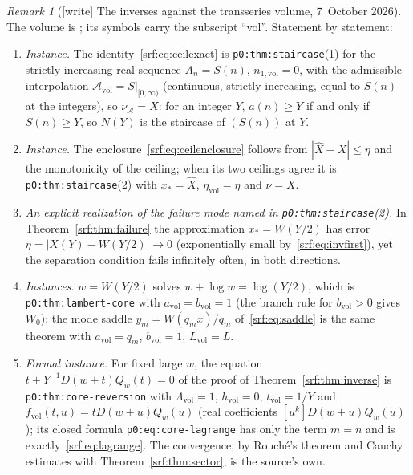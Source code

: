 \documentclass[11pt]{article}
\theoremstyle{remark}\newtheorem{remark}[theorem]{Remark}
\newcommand{\file}[1]{\nolinkurl{#1}}
\begin{document}
\begin{remark}[{[write]} The inverses against the transseries volume, 7~October 2026]\label{srf:rem:transseries}
The volume is
;
its symbols carry the subscript ``vol''. Statement by statement:
\begin{enumerate}[label=(\alph*)]
\item \emph{Instance.} The identity~\eqref{srf:eq:ceilexact} is
 \file{p0:thm:staircase}(1) for the strictly increasing real sequence
 $A_n=S(n)$, $n_{1,\mathrm{vol}}=0$, with the admissible interpolation
 $\mathcal A_{\mathrm{vol}}=S|_{[0,\infty)}$ (continuous, strictly increasing,
 equal to $S(n)$ at the integers), so $\nu_{\mathcal A}=X$: for an integer
 $Y$, $a(n)\ge Y$ if and only if $S(n)\ge Y$, so $N(Y)$ is the staircase of
 $(S(n))$ at $Y$.
\item \emph{Instance.} The enclosure~\eqref{srf:eq:ceilenclosure} follows from
 $|\widehat X-X|\le\eta$ and the monotonicity of the ceiling; when its two
 ceilings agree it is \file{p0:thm:staircase}(2) with $x_*=\widehat X$,
 $\eta_{\mathrm{vol}}=\eta$ and $\nu=X$.
\item \emph{An explicit realization of the failure mode named in
 \file{p0:thm:staircase}(2).} In Theorem~\ref{srf:thm:failure} the
 approximation $x_*=W(Y/2)$ has error $\eta=|X(Y)-W(Y/2)|\to0$ (exponentially
 small by~\eqref{srf:eq:invfirst}), yet the separation condition fails
 infinitely often, in both directions.
\item \emph{Instances.} $w=W(Y/2)$ solves $w+\log w=\log(Y/2)$, which is
 \file{p0:thm:lambert-core} with $a_{\mathrm{vol}}=b_{\mathrm{vol}}=1$ (the
 branch rule for $b_{\mathrm{vol}}>0$ gives $W_0$); the mode saddle
 $y_m=W(q_mx)/q_m$ of~\eqref{srf:eq:saddle} is the same theorem with
 $a_{\mathrm{vol}}=q_m$, $b_{\mathrm{vol}}=1$, $L_{\mathrm{vol}}=L$.
\item \emph{Formal instance.} For fixed large $w$, the equation
 $t+Y^{-1}D(w+t)Q_w(t)=0$ of the proof of Theorem~\ref{srf:thm:inverse} is
 \file{p0:thm:core-reversion} with $\Lambda_{\mathrm{vol}}=1$,
 $h_{\mathrm{vol}}=0$, $t_{\mathrm{vol}}=1/Y$ and
 $f_{\mathrm{vol}}(t,u)=tD(w+u)Q_w(u)$ (real coefficients
 $[u^k]D(w+u)Q_w(u)$); its closed formula \file{p0:eq:core-lagrange} has only
 the term $m=n$ and is exactly~\eqref{srf:eq:lagrange}. The convergence, by
 Rouch\'e's theorem and Cauchy estimates with Theorem~\ref{srf:thm:sector},
 is the source's own.
\end{enumerate}

\end{remark}
\end{document}
